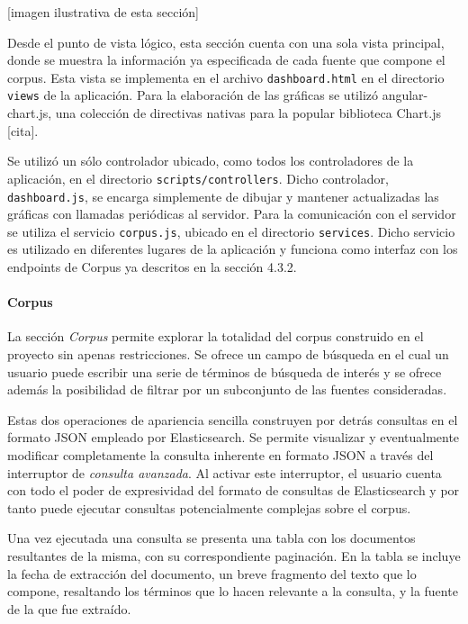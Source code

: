 [imagen ilustrativa de esta sección]

Desde el punto de vista lógico, esta sección cuenta con una sola vista principal, donde se muestra la
información ya especificada de cada fuente que compone el corpus. Esta vista se implementa en el archivo
\texttt{dashboard.html} en el directorio \texttt{views} de la aplicación. Para la elaboración de las
gráficas se utilizó angular-chart.js, una colección de directivas nativas para la popular biblioteca
Chart.js [cita].

Se utilizó un sólo controlador ubicado, como todos los controladores de la aplicación, en el directorio
\texttt{scripts/controllers}. Dicho controlador, \texttt{dashboard.js}, se encarga simplemente de dibujar
y mantener actualizadas las gráficas con llamadas periódicas al servidor. Para la comunicación con el
servidor se utiliza el servicio \texttt{corpus.js}, ubicado en el directorio \texttt{services}. Dicho
servicio es utilizado en diferentes lugares de la aplicación y funciona como interfaz con los endpoints
de Corpus ya descritos en la sección 4.3.2.

\paragraph{Corpus}

La sección \textit{Corpus} permite explorar la totalidad del corpus construido en el proyecto sin apenas
restricciones. Se ofrece un campo de búsqueda en el cual un usuario puede escribir una serie de términos
de búsqueda de interés y se ofrece además la posibilidad de filtrar por un subconjunto de las fuentes
consideradas.

Estas dos operaciones de apariencia sencilla construyen por detrás consultas en el formato JSON empleado
por Elasticsearch. Se permite visualizar y eventualmente modificar completamente la consulta inherente en
formato JSON a través del interruptor de \textit{consulta avanzada}. Al activar este interruptor, el
usuario cuenta con todo el poder de expresividad del formato de consultas de Elasticsearch y por tanto
puede ejecutar consultas potencialmente complejas sobre el corpus.

Una vez ejecutada una consulta se presenta una tabla con los documentos resultantes de la misma, con su
correspondiente paginación. En la tabla se incluye la fecha de extracción del documento, un breve fragmento
del texto que lo compone, resaltando los términos que lo hacen relevante a la consulta, y la fuente de la
que fue extraído.


